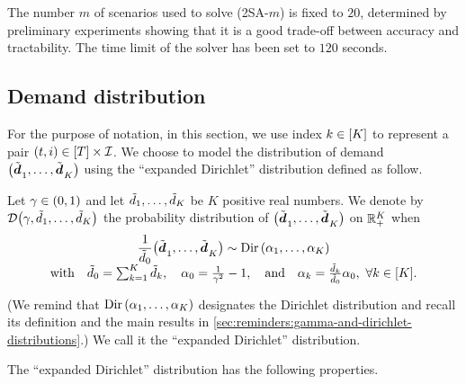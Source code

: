 The number $m$ of scenarios used to solve (2SA-$m$) is fixed to $20$, determined by preliminary experiments showing that it is a good trade-off between accuracy and tractability.
The time limit of the solver has been set to $120$ seconds.


\subsection{Demand distribution}
\label{sec:PDP:numerical-experiments:drawing-realization-of-demand}


For the purpose of notation, in this section, we use index $k\in\range{K}$ to represent a pair $(t,i)\in\range{\horizon}\times\REF$.
We choose to model the distribution of demand $\bracket{\tilde{\va\demand}_1,\ldots,\tilde{\va\demand}_K}$ using the ``expanded Dirichlet'' distribution defined as follow.


Let $\gamma\in\bracket{0,1}$ and let $\tilde{d}_1,\ldots,\tilde{d}_K$ be $K$ positive real numbers. 
We denote by $\cD\bracket{\gamma,\tilde{\demand}_1,\ldots,\tilde{\demand}_K}$ the probability distribution of $\bracket{\tilde{\va\demand}_1,\ldots,\tilde{\va\demand}_K}$ on $\mathbb{R}_+^K$ when
\begin{equation}
  \begin{array}{c}
  \ds\frac{1}{\tilde{\demand}_0}\bracket{\tilde{\va\demand}_1,\ldots,\tilde{\va\demand}_K}\sim\Dir\bracket{\alpha_1,\ldots,\alpha_K}
  \\ \smallskip
  \mbox{with}
  \quad\tilde{\demand}_0=\sum_{k=1}^K\tilde{\demand}_k,
  \quad\alpha_0=\frac{1}{\gamma^2}-1,
  \quad\mbox{and}
  \quad\alpha_k=\frac{\tilde{\demand}_k}{\tilde{\demand}_0}\alpha_0,\ \forall k\in\range{K}.
  \end{array}
\end{equation}
(We remind that $\Dir\bracket{\alpha_1,\ldots,\alpha_K}$ designates the Dirichlet distribution and recall its definition and the main results in \cref{sec:reminders:gamma-and-dirichlet-distributions}.)
We call it the ``expanded Dirichlet'' distribution.


The ``expanded Dirichlet'' distribution has the following properties.


